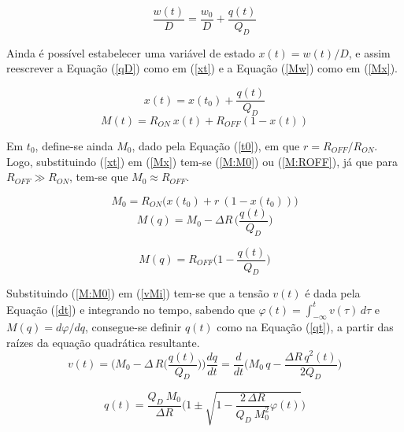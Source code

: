 \documentclass{ceel}
\begin{document}
\begin{multicols}{2}
\begin{equation}\label{qD}
\dfrac{w(t)}{D}=\dfrac{w_0}{D}+\dfrac{q(t)}{Q_D}
\end{equation}
\vspace{0.04cm}

Ainda é possível estabelecer uma variável de estado $x(t)=w(t)/D$, e assim reescrever a Equação (\ref{qD}) como em (\ref{xt}) e a Equação (\ref{Mw}) como em (\ref{Mx}).

\begin{equation}\label{xt}
x(t)=x(t_0)+\dfrac{q(t)}{Q_D}
\end{equation}
\begin{equation}\label{Mx}
M(t)=R_{ON}\ x(t)+ R_{OFF}(1-x(t))
\end{equation}
\vspace{0.001cm}

Em $t_0$, define-se ainda $M_0$, dado pela Equação (\ref{t0}), em que $r=R_{OFF}/R_{ON}$. Logo, substituindo (\ref{xt}) em (\ref{Mx}) tem-se (\ref{M:M0}) ou (\ref{M:ROFF}), já que para $R_{OFF}\gg R_{ON}$, tem-se que $M_0\approx R_{OFF}$.
\vspace{0.05cm}

\begin{equation}\label{t0}
M_0  =R_{ON}\big( x(t_0)+ r\ (1-x(t_0))\big)
\end{equation}
\begin{equation}\label{M:M0}%
M(q)=M_0-\Delta R\, \bigg(\dfrac{q(t)}{Q_D}\bigg)
\end{equation}

\begin{equation}\label{M:ROFF}%
M(q)=R_{OFF}\bigg( 1-\dfrac{q(t)}{Q_D}\bigg)
\end{equation}
\vspace{0.04cm}

Substituindo (\ref{M:M0}) em (\ref{vMi}) tem-se que a tensão $v(t)$ é dada pela Equação (\ref{dt}) e integrando no tempo, sabendo que $\varphi(t)=\int_{-\infty}^t v(\tau)\, d\tau$ e $M(q)=d\varphi/dq$,  consegue-se definir $q(t)$ como na Equação (\ref{qt}), a partir das raízes da equação quadrática resultante.
%
\begin{equation}\label{dt}
v(t)=\Big(M_0-\Delta \, R\Big(\dfrac{q(t)}{Q_D}\Big)\Big)\dfrac{dq}{dt} = \dfrac{d}{dt} \Big(M_0\, q-\dfrac{\Delta R\, q^2(t)}{2 Q_D}\Big)
\end{equation}

\begin{equation}\label{qt}
q(t)=\dfrac{Q_D\ M_0}{\Delta R}\Bigg(1\pm\sqrt{1-\dfrac{2\, \Delta R}{Q_D\ M^2_0}\varphi(t)}\Bigg)
\end{equation} 
\vspace{0.04cm}


\end{multicols}
\end{document}
